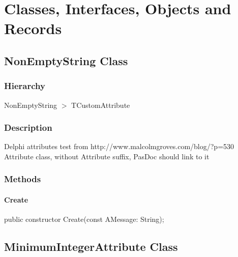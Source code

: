 \documentclass{report}
\begin{document}
\section{Classes, Interfaces, Objects and Records}
\subsection*{NonEmptyString Class}
\subsubsection*{\large{\textbf{Hierarchy}}\normalsize\hspace{1ex}\hfill}
NonEmptyString {$>$} TCustomAttribute
\subsubsection*{\large{\textbf{Description}}\normalsize\hspace{1ex}\hfill}
Delphi attributes test from http://www.malcolmgroves.com/blog/?p=530 Attribute class, without Attribute suffix, PasDoc should link to it\subsubsection*{\large{\textbf{Methods}}\normalsize\hspace{1ex}\hfill}
\paragraph*{Create}\hspace*{\fill}

\begin{list}{}{
\setlength{\itemindent}{0cm}
\setlength{\listparindent}{0cm}
\setlength{\leftmargin}{\evensidemargin}
\addtolength{\leftmargin}{\tmplength}
\settowidth{\labelsep}{X}
\addtolength{\leftmargin}{\labelsep}
\setlength{\labelwidth}{\tmplength}
}
\begin{flushleft}
\item[\textbf{Declaration}\hfill]
\begin{ttfamily}
public constructor Create(const AMessage: String);\end{ttfamily}


\end{flushleft}
\end{list}
\subsection*{MinimumIntegerAttribute Class}
\end{document}

